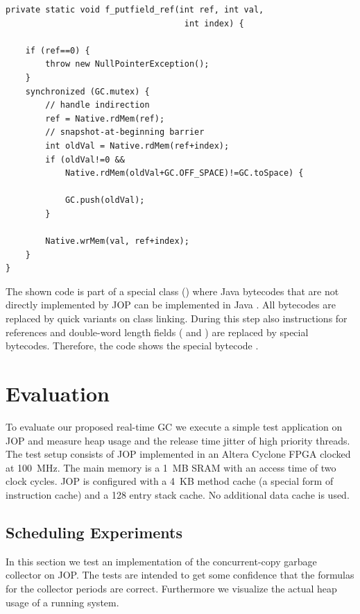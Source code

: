 \begin{lstlisting}
private static void f_putfield_ref(int ref, int val,
                                    int index) {

    if (ref==0) {
        throw new NullPointerException();
    }
    synchronized (GC.mutex) {
        // handle indirection
        ref = Native.rdMem(ref);
        // snapshot-at-beginning barrier
        int oldVal = Native.rdMem(ref+index);
        if (oldVal!=0 &&
            Native.rdMem(oldVal+GC.OFF_SPACE)!=GC.toSpace) {

            GC.push(oldVal);
        }

        Native.wrMem(val, ref+index);
    }
}
\end{lstlisting}

The shown code is part of a special class ()
where Java bytecodes that are not directly implemented by JOP can be
implemented in Java \cite{jop:thesis}. All  bytecodes are
replaced by quick variants on class linking. During this step also
 instructions for references and double-word length fields
( and ) are replaced by special
bytecodes. Therefore, the code shows the special bytecode
.



\section{Evaluation}

To evaluate our proposed real-time GC we execute a simple test
application on JOP and measure heap usage and the release time
jitter of high priority threads. The test setup consists of JOP
implemented in an Altera Cyclone FPGA clocked at 100~MHz. The main
memory is a 1~MB SRAM with an access time of two clock cycles. JOP
is configured with a 4~KB method cache (a special form of
instruction cache) and a 128 entry stack cache. No additional data
cache is used.

\subsection{Scheduling Experiments}

In this section we test an implementation of the concurrent-copy
garbage collector on JOP. The tests are intended to get some
confidence that the formulas for the collector periods are correct.
Furthermore we visualize the actual heap usage of a running system.

